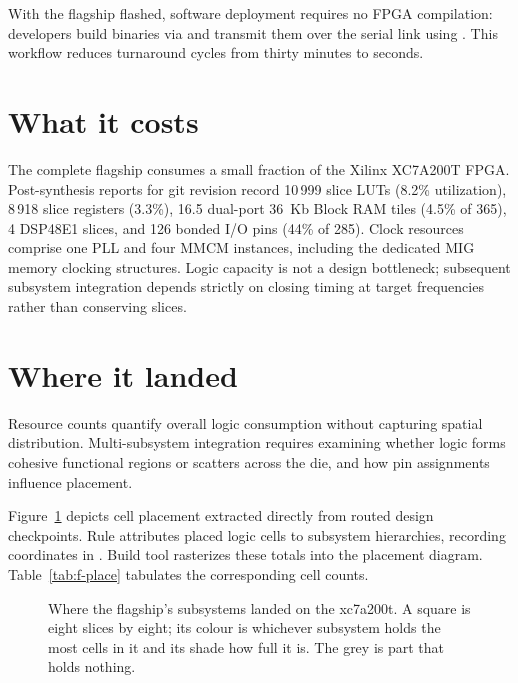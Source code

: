 \documentclass[journal,9pt]{IEEEtran}
\begin{document}
With the flagship flashed, software deployment requires no FPGA compilation:
developers build binaries via  and transmit them over the serial link
using . This workflow reduces turnaround cycles from thirty minutes
to seconds.

\section{What it costs}
\label{sec:f-cost}

The complete flagship consumes a small fraction of the Xilinx XC7A200T FPGA.
Post-synthesis reports for git revision  record 10\,999 slice LUTs
(8.2\% utilization), 8\,918 slice registers (3.3\%), 16.5 dual-port 36~Kb Block
RAM tiles (4.5\% of 365), 4 DSP48E1 slices, and 126 bonded I/O pins (44\% of
285). Clock resources comprise one PLL and four MMCM instances, including the
dedicated MIG memory clocking structures. Logic capacity is not a design
bottleneck; subsequent subsystem integration depends strictly on closing timing
at target frequencies rather than conserving slices.

\section{Where it landed}
\label{sec:f-place}

Resource counts quantify overall logic consumption without capturing spatial
distribution. Multi-subsystem integration requires examining whether logic forms
cohesive functional regions or scatters across the die, and how pin assignments
influence placement.

Figure~\ref{fig:f-map} depicts cell placement extracted directly from routed
design checkpoints. Rule  attributes placed logic
cells to subsystem hierarchies, recording coordinates in
. Build tool  rasterizes
these totals into the placement diagram. Table~\ref{tab:f-place} tabulates the
corresponding cell counts.

\begin{figure}[t]
\centering

\caption{Where the flagship's subsystems landed on the xc7a200t. A
square is eight slices by eight; its colour is whichever subsystem
holds the most cells in it and its shade how full it is. The grey is
part that holds nothing.}
\label{fig:f-map}
\end{figure}
\end{document}
